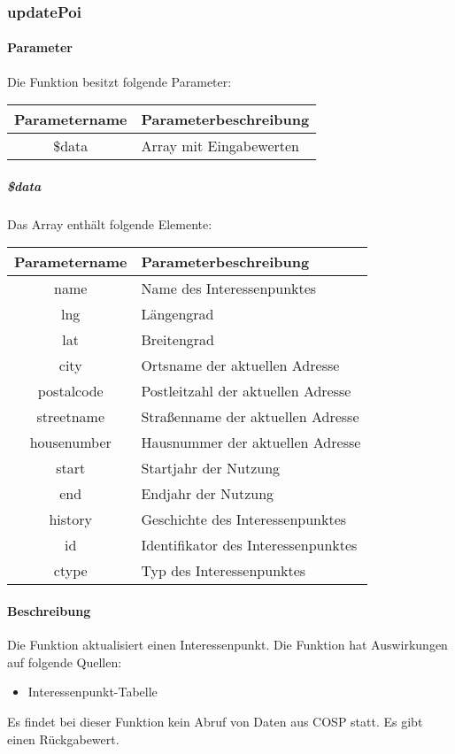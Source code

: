 \subsubsection{updatePoi}
\paragraph{Parameter} Die Funktion besitzt folgende Parameter:
\begin{table}[H]
	\begin{tabular}{|c|p{11cm}|}
		\hline
		\textbf{Parametername} & \textbf{Parameterbeschreibung} \\ \hline
		\$data & Array mit Eingabewerten \\ \hline
	\end{tabular}
\end{table}
\subparagraph{\$data}Das Array enthält folgende Elemente:
\begin{table}[H]
	\begin{tabular}{|c|p{11cm}|}
		\hline
		\textbf{Parametername} & \textbf{Parameterbeschreibung} \\ \hline
		name        & Name des Interessenpunktes \\ \hline
		lng         & Längengrad \\ \hline
		lat         & Breitengrad \\ \hline
		city        & Ortsname der aktuellen Adresse \\ \hline
		postalcode  & Postleitzahl der aktuellen Adresse \\ \hline
		streetname  & Straßenname der aktuellen Adresse \\ \hline
		housenumber & Hausnummer der aktuellen Adresse \\ \hline
		start       & Startjahr der Nutzung \\ \hline
		end         & Endjahr der Nutzung \\ \hline
		history     & Geschichte des Interessenpunktes \\ \hline
		id          & Identifikator des Interessenpunktes \\ \hline
		ctype       & Typ des Interessenpunktes \\ \hline
	\end{tabular}
\end{table}
\paragraph{Beschreibung} Die Funktion aktualisiert einen Interessenpunkt. Die Funktion hat Auswirkungen auf folgende Quellen:
\begin{itemize}
	\item Interessenpunkt-Tabelle
\end{itemize}
Es findet bei dieser Funktion kein Abruf von Daten aus {\glqq COSP\grqq} statt. Es gibt einen Rückgabewert.
